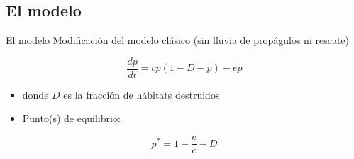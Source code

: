 \documentclass[
  11pt,
  ignorenonframetext,
]{beamer}
\begin{document}
\hypertarget{el-modelo}{%
\subsection{El modelo}\label{el-modelo}}

\begin{frame}{El modelo}
Modificación del modelo clásico (sin lluvia de propágulos ni rescate)

\[\frac{dp}{dt} = cp(1-D-p) - ep\]

\begin{itemize}
\item
  donde \(D\) es la fracción de hábitats destruidos
\item
  Punto(s) de equilibrio:
\end{itemize}

\[p^* = 1 - \frac{e}{c} - D\]
\end{frame}
\end{document}
